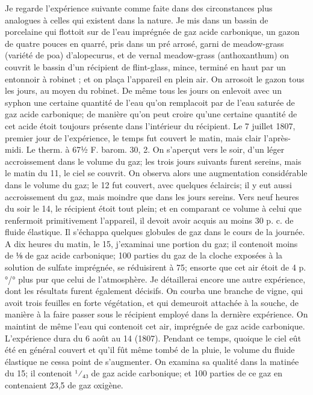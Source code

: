 Je regarde l'expérience suivante comme faite dans des circonstances plus analogues à celles qui existent dans la nature. Je mis dans un bassin de porcelaine qui flottoit sur de l'eau imprégnée de gaz acide carbonique, un gazon de quatre pouces en quarré, pris dans un pré arrosé, garni de meadow-grass (variété de poa) d'alopecurus, et de vernal meadow-grass (anthoxanthum) on couvrit le bassin d'un récipient de flint-glass, mince, terminé en haut par un entonnoir à robinet ; et on plaça l'appareil en plein air. On arrosoit le gazon tous les jours, au moyen du robinet. De même tous les jours on enlevoit avec un syphon une certaine quantité de l'eau qu'on remplacoit par de l'eau saturée de gaz acide carbonique; de manière qu'on peut croire qu'une certaine quantité de cet acide étoit toujours présente dans l'intérieur du récipient.
Le 7 juillet 1807, premier jour de l'expérience, le temps fut couvert le matin, mais clair l'après-midi. Le therm. à 67½ F. barom.\setcounter{page}{30} 30, 2. On s'aperçut vers le soir, d'un léger accroissement dans le volume du gaz; les trois jours suivants furent sereins, mais le matin du 11, le ciel se couvrit. On observa alors une augmentation considérable dans le volume du gaz; le 12 fut couvert, avec quelques éclaircis; il y eut aussi accroissement du gaz, mais moindre que dans les jours sereins. Vers neuf heures du soir le 14, le récipient étoit tout plein; et en comparant ce volume à celui que renfermoit primitivement l'appareil, il devoit avoir acquis au moins 30 p. c. de fluide élastique. Il s'échappa quelques globules de gaz dans le cours de la journée. A dix heures du matin, le 15, j'examinai une portion du gaz; il contenoit moins de ⅛ de gaz acide carbonique; 100 parties du gaz de la cloche exposées à la solution de sulfate imprégnée, se réduisirent à 75; ensorte que cet air étoit de 4 p. °/° plus pur que celui de l'atmosphère. Je détaillerai encore une autre expérience, dont les résultats furent également décisifs. On courba une branche de vigne, qui avoit trois feuilles en forte végétation, et qui demeuroit attachée à la souche, de manière à la faire passer sous le récipient employé dans la dernière expérience. On maintint de même l'eau qui contenoit cet air, imprégnée de gaz acide carbonique. L'expérience\setcounter{page}{31} dura du 6 août au 14 (1807). Pendant ce temps, quoique le ciel eût été en général couvert et qu'il fût même tombé de la pluie, le volume du fluide élastique ne cessa point de s'augmenter. On examina sa qualité dans la matinée du 15; il contenoit ¹⁄₄₃ de gaz acide carbonique; et 100 parties de ce gaz en contenaient 23,5 de gaz oxigène.
